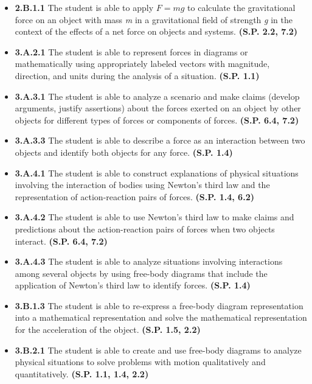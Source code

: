 \documentclass[
]{book}
\providecommand{\tightlist}{%
  \setlength{\itemsep}{0pt}\setlength{\parskip}{0pt}}
\newenvironment{learning-objectives}{}{}
\begin{document}
\begin{learning-objectives}
\begin{itemize}
\tightlist
\item
  \textbf{2.B.1.1} The student is able to apply \(F = mg\) to calculate the
  gravitational force on an object with mass \emph{m} in a gravitational
  field of strength \emph{g} in the context of the effects of a net force
  on objects and systems. \textbf{(S.P. 2.2, 7.2)}
\item
  \textbf{3.A.2.1} The student is able to represent forces in diagrams or
  mathematically using appropriately labeled vectors with magnitude,
  direction, and units during the analysis of a situation. \textbf{(S.P.
  1.1)}
\item
  \textbf{3.A.3.1} The student is able to analyze a scenario and make
  claims (develop arguments, justify assertions) about the forces
  exerted on an object by other objects for different types of forces
  or components of forces. \textbf{(S.P. 6.4, 7.2)}
\item
  \textbf{3.A.3.3} The student is able to describe a force as an
  interaction between two objects and identify both objects for any
  force. \textbf{(S.P. 1.4)}
\item
  \textbf{3.A.4.1} The student is able to construct explanations of
  physical situations involving the interaction of bodies using
  Newton's third law and the representation of action-reaction pairs
  of forces. \textbf{(S.P. 1.4, 6.2)}
\item
  \textbf{3.A.4.2} The student is able to use Newton's third law to make
  claims and predictions about the action-reaction pairs of forces
  when two objects interact. \textbf{(S.P. 6.4, 7.2)}
\item
  \textbf{3.A.4.3} The student is able to analyze situations involving
  interactions among several objects by using free-body diagrams that
  include the application of Newton's third law to identify forces.
  \textbf{(S.P. 1.4)}
\item
  \textbf{3.B.1.3} The student is able to re-express a free-body diagram
  representation into a mathematical representation and solve the
  mathematical representation for the acceleration of the object.
  \textbf{(S.P. 1.5, 2.2)}
\item
  \textbf{3.B.2.1} The student is able to create and use free-body diagrams
  to analyze physical situations to solve problems with motion
  qualitatively and quantitatively. \textbf{(S.P. 1.1, 1.4, 2.2)}
\end{itemize}

\end{learning-objectives}
\end{document}
